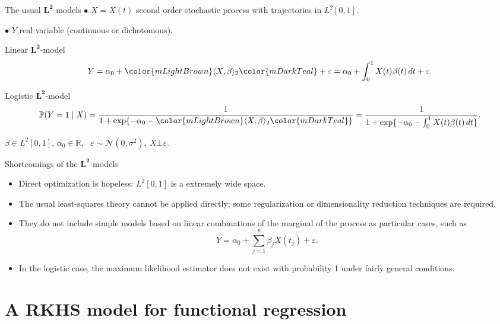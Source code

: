 \documentclass[9pt, english, professionalfonts]{beamer}
\newcommand\maroon[1]{\color{mLightBrown}#1\color{mDarkTeal}}
\begin{document}
\begin{frame}{The usual \(\bm{L^2}\)-models}
  \(\bullet\) \(X=X(t)\) second order stochastic process with trajectories in \(L^2[0, 1]\).

  \(\bullet\) \(Y\) real variable (continuous or dichotomous).

  \vspace{1em}

\begin{block}{Linear \(\bm{L^2}\)-model}
  \[
    Y = \alpha_0 + \maroon{\langle X, \beta \rangle_2} + \varepsilon = \alpha_0 + \int_0^1 X(t)\beta(t)\, dt + \varepsilon.
  \]
\end{block}

\begin{block}{Logistic \(\bm{L^2}\)-model}
    \[
    \mathbb P (Y=1\mid X) = \frac{1}{1 + \exp\{-\alpha_0 - \maroon{\langle X, \beta\rangle_2}\}} = \frac{1}{1 + \exp\{-\alpha_0 - \int_0^1 X(t)\beta(t)\, dt\}}.
  \]
\end{block}
  \maroon{\(\beta \in L^2[0,1]\)}, \(\alpha_0\in\mathbb R\), \ \(\varepsilon \sim \mathcal N(0, \sigma^2), \ X \bot \varepsilon\).

\end{frame}

\begin{frame}{Shortcomings of the \(\bm{L^2}\)-models}
  \begin{itemize}
    \item Direct optimization is hopeless: \(L^2[0,1]\) is a \maroon{extremely wide space}.
    \item The usual least-squares theory cannot be applied directly; some regularization or dimensionality reduction techniques are required.
    \item They do not include simple models based on linear combinations of the marginal of the process as particular cases, such as
    \[
      Y = \alpha_0 + \sum_{j=1}^p \beta_j X(t_j) + \varepsilon.
    \]
    \item In the logistic case, the maximum likelihood estimator does not exist with probability 1 under fairly general conditions.
  \end{itemize}
\end{frame}

\section{A RKHS model for functional regression}
\end{document}
